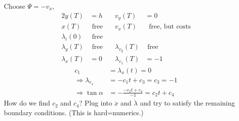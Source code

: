 \documentclass[letterpaper,12pt,titlepage]{report}
\theoremstyle{plain}
\theoremstyle{definition}
\begin{document}
\begin{center}
\end{center}
Choose $\Psi=-v_x$,
\begin{alignat}{2}
  y(T) &= h & v_y(T) &= 0 \\
  x(T) & \text{ free} \quad & v_x(T) &\phantom{x} \text{free, but costs} \\
  \lambda_i(0) & \text{ free} \\
  \lambda_y(T) & \text{ free} & \lambda_{v_y}(T) & \text{ free} \\
  \lambda_x(T) &= 0 & \lambda_{v_x}(T) &= -1
\end{alignat}
\begin{align}
  c_1 &= \lambda_x(t) = 0 \\
  \Longrightarrow \lambda_{v_x} &= -c_1t + c_3 = c_3 = -1 \\
  \Longrightarrow \tan\alpha &= -\frac{-c_2t+c_4}{-1} = c_2t + c_4
\end{align}
How do we find $c_2$ and $c_4$? Plug into $\dot x$ and $\dot\lambda$ and try to satisfy the remaining boundary conditions. (This is hard=numerics.)

\end{document}
